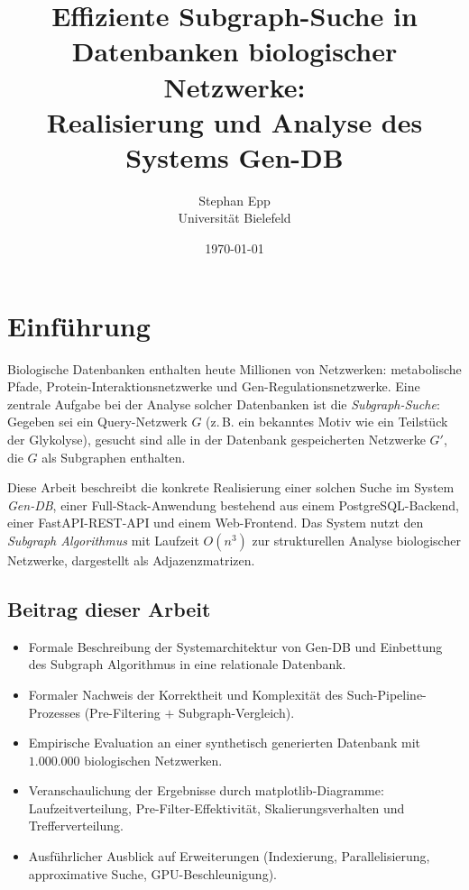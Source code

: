 \documentclass[a4paper,12pt]{article}
\title{Effiziente Subgraph-Suche in Datenbanken biologischer Netzwerke:\\
Realisierung und Analyse des Systems Gen-DB}
\author{Stephan Epp\\Universität Bielefeld}
\date{\today}
\theoremstyle{definition}
\begin{document}
\maketitle

\tableofcontents
\newpage

\section{Einführung}

Biologische Datenbanken enthalten heute Millionen von Netzwerken: metabolische Pfade, Protein-Interaktionsnetzwerke und Gen-Regulationsnetzwerke. Eine zentrale Aufgabe bei der Analyse solcher Datenbanken ist die \emph{Subgraph-Suche}: Gegeben sei ein Query-Netzwerk $G$ (z.\,B. ein bekanntes Motiv wie ein Teilstück der Glykolyse), gesucht sind alle in der Datenbank gespeicherten Netzwerke $G'$, die $G$ als Subgraphen enthalten.

Diese Arbeit beschreibt die konkrete Realisierung einer solchen Suche im System \emph{Gen-DB}, einer Full-Stack-Anwendung bestehend aus einem PostgreSQL-Backend, einer FastAPI-REST-API und einem Web-Frontend. Das System nutzt den \emph{Subgraph Algorithmus} \cite{epp2026subgraph} mit Laufzeit $O(n^3)$ zur strukturellen Analyse biologischer Netzwerke, dargestellt als Adjazenzmatrizen.

\subsection{Beitrag dieser Arbeit}

\begin{itemize}
	\item Formale Beschreibung der Systemarchitektur von Gen-DB und Einbettung des Subgraph Algorithmus in eine relationale Datenbank.
	\item Formaler Nachweis der Korrektheit und Komplexität des Such-Pipeline-Prozesses (Pre-Filtering $+$ Subgraph-Vergleich).
	\item Empirische Evaluation an einer synthetisch generierten Datenbank mit $1.000.000$ biologischen Netzwerken.
	\item Veranschaulichung der Ergebnisse durch matplotlib-Diagramme: Laufzeitverteilung, Pre-Filter-Effektivität, Skalierungsverhalten und Trefferverteilung.
	\item Ausführlicher Ausblick auf Erweiterungen (Indexierung, Parallelisierung, approximative Suche, GPU-Beschleunigung).
\end{itemize}
\end{document}
